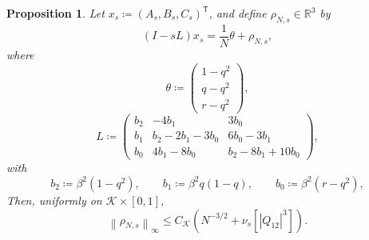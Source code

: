 \documentclass[11pt]{article}
\newtheorem{proposition}[theorem]{Proposition}
\numberwithin{equation}{section}
\newcommand{\R}{\mathbb{R}}
\newcommand{\1}{\mathbf 1}
\newcommand{\cK}{\mathcal K}
\newcommand{\norm}[1]{\left\lVert #1\right\rVert}
\begin{document}
\begin{proposition}
\label{prop:cavity}
Let $x_s\coloneqq(A_s,B_s,C_s)^{\mathsf T}$, and define
$\rho_{N,s}\in\R^3$ by
\begin{equation}
 (I-sL)x_s=\frac1N\theta+\rho_{N,s},
 \label{eq:cavitysystem}
\end{equation}
where
\begin{equation}
 \theta\coloneqq
 \begin{pmatrix}
 1-q^2\\ q-q^2\\ r-q^2
 \end{pmatrix},
 \label{eq:theta}
\end{equation}
\begin{equation}
 L\coloneqq
 \begin{pmatrix}
 b_2&-4b_1&3b_0\\
 b_1&b_2-2b_1-3b_0&6b_0-3b_1\\
 b_0&4b_1-8b_0&b_2-8b_1+10b_0
 \end{pmatrix},
 \label{eq:L}
\end{equation}
with
\begin{equation}
 b_2\coloneqq\beta^2(1-q^2),\qquad
 b_1\coloneqq\beta^2q(1-q),\qquad
 b_0\coloneqq\beta^2(r-q^2),
 \label{eq:bs}
\end{equation}
Then, uniformly on $\cK\times[0,1]$,
\begin{equation}
 \norm{\rho_{N,s}}_\infty
 \le C_{\cK}
 \left(N^{-3/2}+\nu_s[|Q_{12}|^3]\right).
 \label{eq:rho}
\end{equation}
\end{proposition}
\end{document}
